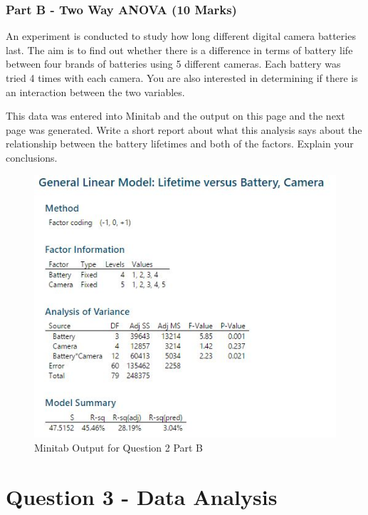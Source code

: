 \documentclass[a4paper,12pt]{article}
\begin{document}
\newpage
\subsubsection*{Part B - Two Way ANOVA (10 Marks)}
	\noindent An experiment is conducted to study how long different digital camera batteries last. The 	aim is to find out whether there is a difference in terms of battery life between four brands of 
	batteries using 5 different cameras. Each battery was tried 4 times with each camera.   You are also interested in determining if there is an interaction between the two variables.
	
	


\noindent This data was entered into Minitab and the output on this page and the next page was generated. Write a short report about what this analysis says about the relationship between the battery lifetimes and both of the factors. Explain your conclusions.


\begin{figure}[h!]
\centering
\includegraphics[width=01.1\linewidth]{images/Repeat2017-Q2b-Output1}
\caption{Minitab Output for Question 2 Part B}
\label{fig:Repeat2017-Q2b-Output1}
\end{figure}



\section*{Question 3 - Data Analysis }
\end{document}
